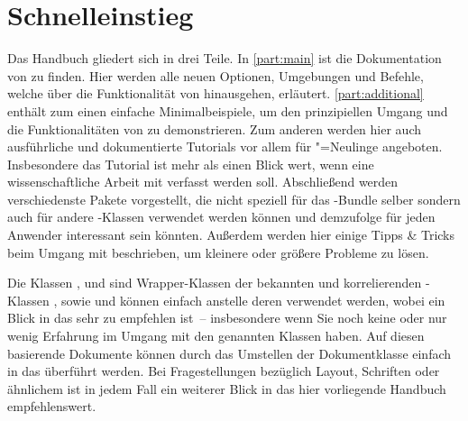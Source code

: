 \section{Schnelleinstieg}
%
Das Handbuch gliedert sich in drei Teile. In \autoref{part:main} ist die 
Dokumentation von \TUDScript zu finden. Hier werden alle neuen Optionen, 
Umgebungen und Befehle, welche über die Funktionalität von \KOMAScript 
hinausgehen, erläutert. \autoref{part:additional} enthält zum einen einfache 
Minimalbeispiele, um den prinzipiellen Umgang und die Funktionalitäten von 
\TUDScript zu demonstrieren. Zum anderen werden hier auch ausführliche und 
dokumentierte Tutorials vor allem für "=Neulinge angeboten. 
Insbesondere das Tutorial  ist mehr als einen Blick wert, 
wenn eine wissenschaftliche Arbeit mit  verfasst werden soll.
Abschließend werden verschiedenste Pakete vorgestellt, die nicht speziell für 
das \TUDScript-Bundle selber sondern auch für andere -Klassen
verwendet werden können und demzufolge für jeden Anwender interessant sein 
könnten. Außerdem werden hier einige Tipps \& Tricks beim Umgang mit 
 beschrieben, um kleinere oder größere Probleme zu lösen.

Die Klassen ,  und  
sind Wrapper-Klassen der bekannten und korrelierenden \KOMAScript-Klassen 
,  sowie  und können einfach 
anstelle deren verwendet werden, wobei ein Blick in das \scrguide sehr zu 
empfehlen ist~-- insbesondere wenn Sie noch keine oder nur wenig Erfahrung im 
Umgang mit den genannten Klassen haben. Auf diesen basierende Dokumente können 
durch das Umstellen der Dokumentklasse einfach in das \TUDCD überführt werden. 
Bei Fragestellungen bezüglich Layout, Schriften oder ähnlichem ist in jedem 
Fall ein weiterer Blick in das hier vorliegende Handbuch empfehlenswert.
